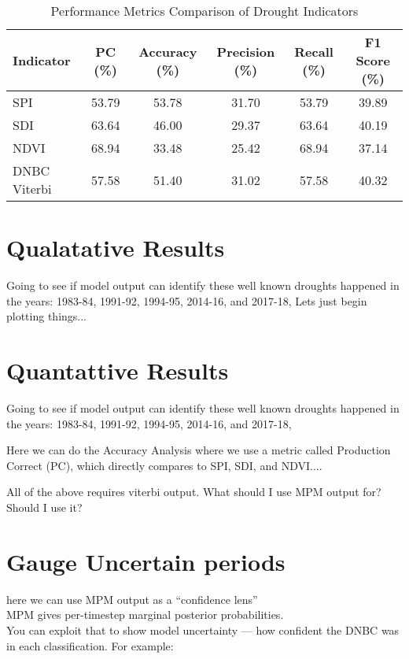 \begin{table}[!h]
\centering
\caption{Performance Metrics Comparison of Drought Indicators}
\label{tab:performance_metrics}
\begin{tabular}{lccccc}
\toprule
Indicator & PC (\%) & Accuracy (\%) & Precision (\%) & Recall (\%) & F1 Score (\%) \\
\midrule
SPI       & 53.79   & 53.78         & 31.70          & 53.79       & 39.89         \\
SDI       & 63.64   & 46.00         & 29.37          & 63.64       & 40.19         \\
NDVI      & 68.94   & 33.48         & 25.42          & 68.94       & 37.14         \\
DNBC Viterbi   & 57.58   & 51.40         & 31.02          & 57.58       & 40.32         \\
\bottomrule
\end{tabular}
\end{table}

\section{Qualatative Results}
Going to see if model output can identify these well known droughts happened in the years: 1983-84, 1991-92, 1994-95, 2014-16, and 2017-18,
Lets just begin plotting things...

\section{Quantattive Results}
Going to see if model output can identify these well known droughts happened in the years: 1983-84, 1991-92, 1994-95, 2014-16, and 2017-18,

Here we can do the Accuracy Analysis where we use a metric called Production Correct (PC), which directly compares to SPI, SDI, and NDVI....

All of the above requires viterbi output. What should I use MPM output for? Should I use it?


\section{Gauge Uncertain periods}

here we can use MPM output as a “confidence lens” \\
MPM gives per-timestep marginal posterior probabilities. \\
You can exploit that to show model uncertainty — how confident the DNBC was in each classification.
For example:


